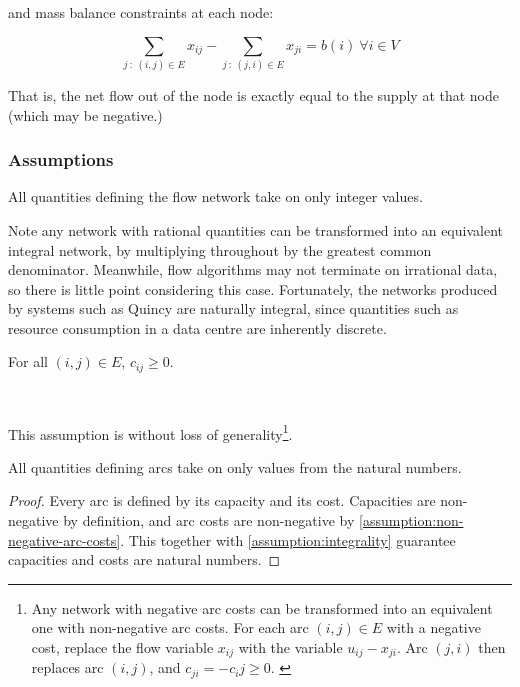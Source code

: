and mass balance constraints at each node:

\begin{equation} \label{eq:mass-balance}
\sum_{j\::\:(i,j)\in E}x_{ij}-\sum_{j\::\:(j,i)\in E}x_{ji}=b(i)\:\forall i\in V
\end{equation}

That is, the net flow out of the node is exactly equal to the supply
at that node (which may be negative.)

\subsubsection{Assumptions}

\begin{assumption}[Integrality] \label{assumption:integrality}
All quantities defining the flow network take on only integer values.\end{assumption}
    
Note any network with rational quantities can be transformed into an equivalent integral network, by multiplying throughout by the greatest common denominator. Meanwhile, flow algorithms may not terminate on irrational data, so there is little point considering this case. Fortunately, the networks produced by systems such as Quincy are naturally integral, since quantities such as resource consumption in a data centre are inherently discrete. \\

\begin{assumption} \label{assumption:non-negative-arc-costs}
For all $(i,j) \in E$, $c_{ij} \geq 0$.\end{assumption}

~

\begin{remark} 
This assumption is without loss of generality\footnote{Any network with negative arc costs can be transformed into an equivalent one with non-negative arc costs. For each arc $(i,j) \in E$ with a negative cost, replace the flow variable $x_{ij}$ with the variable $u_{ij} - x_{ji}$. Arc $(j,i)$ then replaces arc $(i,j)$, and $c_{ji} = -c_ij \geq 0$. \cite[p.~48]{Ahuja:1993}}.
\end{remark}

\begin{cor}All quantities defining arcs take on only values from the natural numbers.\footnotemark
{}
\end{cor}
\begin{proof}
Every arc is defined by its capacity and its cost. Capacities are non-negative by definition, and arc costs are non-negative by \cref{assumption:non-negative-arc-costs}. This together with \cref{assumption:integrality} guarantee capacities and costs are natural numbers.
\end{proof}

